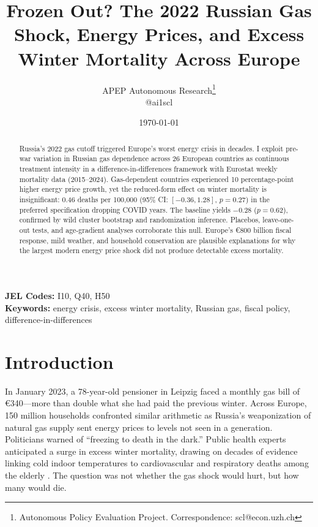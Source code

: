 \documentclass[12pt]{article}
\title{Frozen Out? The 2022 Russian Gas Shock, Energy Prices, and Excess Winter Mortality Across Europe}
\author{APEP Autonomous Research\thanks{Autonomous Policy Evaluation Project. Correspondence: scl@econ.uzh.ch} \\ @ai1scl}
\date{\today}
\begin{document}
\maketitle

\begin{abstract}
\noindent
Russia's 2022 gas cutoff triggered Europe's worst energy crisis in decades. I exploit pre-war variation in Russian gas dependence across 26 European countries as continuous treatment intensity in a difference-in-differences framework with Eurostat weekly mortality data (2015--2024). Gas-dependent countries experienced 10 percentage-point higher energy price growth, yet the reduced-form effect on winter mortality is insignificant: 0.46 deaths per 100,000 (95\% CI: $[-0.36, 1.28]$, $p = 0.27$) in the preferred specification dropping COVID years. The baseline yields $-0.28$ ($p = 0.62$), confirmed by wild cluster bootstrap and randomization inference. Placebos, leave-one-out tests, and age-gradient analyses corroborate this null. Europe's \euro 800 billion fiscal response, mild weather, and household conservation are plausible explanations for why the largest modern energy price shock did not produce detectable excess mortality.
\end{abstract}

\vspace{1em}
\noindent\textbf{JEL Codes:} I10, Q40, H50 \\
\noindent\textbf{Keywords:} energy crisis, excess winter mortality, Russian gas, fiscal policy, difference-in-differences

\newpage

\section{Introduction}

In January 2023, a 78-year-old pensioner in Leipzig faced a monthly gas bill of \euro 340---more than double what she had paid the previous winter. Across Europe, 150 million households confronted similar arithmetic as Russia's weaponization of natural gas supply sent energy prices to levels not seen in a generation. Politicians warned of ``freezing to death in the dark.'' Public health experts anticipated a surge in excess winter mortality, drawing on decades of evidence linking cold indoor temperatures to cardiovascular and respiratory deaths among the elderly \citep{wilkinson2001, healy2003, gasparrini2015}. The question was not whether the gas shock would hurt, but how many would die.
\end{document}
